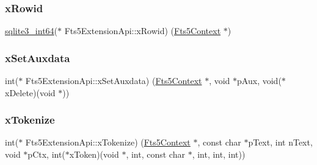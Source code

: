 \mbox{\label{struct_fts5_extension_api_acc4336c9f7bf39defa1acbdbf5df0020}} 
\subsubsection{\texorpdfstring{xRowid}{xRowid}}
{\footnotesize\ttfamily \mbox{\hyperlink{sqlite3_8h_a0a4d3e6c1ad46f90e746b920ab6ca0d2}{sqlite3\+\_\+int64}}($\ast$ Fts5\+Extension\+Api\+::x\+Rowid) (\mbox{\hyperlink{sqlite3_8h_a97821b95ebebd43db901977ffd5b26bc}{Fts5\+Context}} $\ast$)}

\mbox{\label{struct_fts5_extension_api_a0f59a6c383a478ed95efdb7e4a95de80}} 
\subsubsection{\texorpdfstring{xSetAuxdata}{xSetAuxdata}}
{\footnotesize\ttfamily int($\ast$ Fts5\+Extension\+Api\+::x\+Set\+Auxdata) (\mbox{\hyperlink{sqlite3_8h_a97821b95ebebd43db901977ffd5b26bc}{Fts5\+Context}} $\ast$, void $\ast$p\+Aux, void($\ast$x\+Delete)(void $\ast$))}

\mbox{\label{struct_fts5_extension_api_a670af0d7715f69834376f8df187dcf30}} 
\subsubsection{\texorpdfstring{xTokenize}{xTokenize}}
{\footnotesize\ttfamily int($\ast$ Fts5\+Extension\+Api\+::x\+Tokenize) (\mbox{\hyperlink{sqlite3_8h_a97821b95ebebd43db901977ffd5b26bc}{Fts5\+Context}} $\ast$, const char $\ast$p\+Text, int n\+Text, void $\ast$p\+Ctx, int($\ast$x\+Token)(void $\ast$, int, const char $\ast$, int, int, int))}

\mbox{\label{struct_fts5_extension_api_a8e651288d8e0cf25f20f2b838f47ac34}} 
